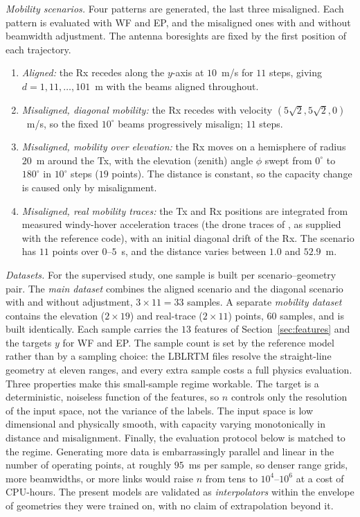 \documentclass[correspondence]{IEEEtaes}
\newcommand{\PLMASTEP}{$95$~ms}       %
\begin{document}
\emph{Mobility scenarios.} Four patterns are generated, the last three misaligned. Each
pattern is evaluated with WF and EP, and the misaligned ones with and without beamwidth
adjustment. The antenna boresights are fixed by the first position of each trajectory.
\begin{enumerate}
\def\labelenumi{\arabic{enumi})}
\item \emph{Aligned:} the Rx recedes along the $y$-axis at $10$~m/s for $11$ steps,
giving $d=1,11,\dots,101$~m with the beams aligned throughout.
\item \emph{Misaligned, diagonal mobility:} the Rx recedes with velocity
$(5\sqrt2,5\sqrt2,0)$~m/s, so the fixed $10^\circ$ beams progressively misalign; $11$
steps.
\item \emph{Misaligned, mobility over elevation:} the Rx moves on a hemisphere of radius
$20$~m around the Tx, with the elevation (zenith) angle $\phi$ swept from $0^\circ$ to
$180^\circ$ in $10^\circ$ steps ($19$ points). The distance is constant, so the capacity
change is caused only by misalignment.
\item \emph{Misaligned, real mobility traces:} the Tx and Rx positions are integrated from
measured windy-hover acceleration traces (the drone traces of \cite{moorthy2022beam}, as
supplied with the reference code), with an initial diagonal drift of the Rx. The scenario
has $11$ points over $0$--$5$~s, and the distance varies between $1.0$ and $52.9$~m.
\end{enumerate}

\emph{Datasets.} For the supervised study, one sample is built per scenario--geometry
pair. The \emph{main dataset} combines the aligned scenario and the diagonal scenario with
and without adjustment, $3\times11=33$ samples. A separate \emph{mobility dataset}
contains the elevation ($2\times19$) and real-trace ($2\times11$) points, $60$ samples, and
is built identically. Each sample carries the $13$ features of Section~\ref{sec:features}
and the targets $y$ for WF and EP. The sample count is set by the reference model rather
than by a sampling choice: the LBLRTM files resolve the straight-line geometry at eleven
ranges, and every extra sample costs a full physics evaluation. Three properties make this
small-sample regime workable. The target is a deterministic, noiseless function of the
features, so $n$ controls only the resolution of the input space, not the variance of the
labels. The input space is low dimensional and physically smooth, with capacity varying
monotonically in distance and misalignment. Finally, the evaluation protocol below is
matched to the regime. Generating more data is embarrassingly parallel and linear in
the number of operating points, at roughly \PLMASTEP{} per sample, so denser range grids,
more beamwidths, or more links would raise $n$ from tens to $10^4$--$10^6$ at a cost of
CPU-hours. The present models are validated as \emph{interpolators} within the envelope of
geometries they were trained on, with no claim of extrapolation beyond it.
\end{document}
